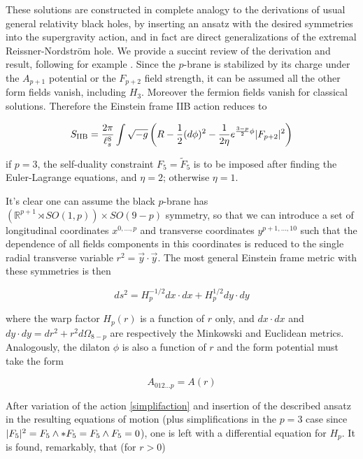 These solutions are constructed in complete analogy to the derivations of usual general relativity black holes, by inserting an ansatz with the desired symmetries into the supergravity action, and in fact are direct generalizations of the extremal Reissner-Nordstr\"om hole. We provide a succint review of the derivation and result, following for example \cite{MaldacenaDb}. Since the $p$-brane is stabilized by its charge under the $A_{p+1}$ potential or the $F_{p+2}$ field strength, it can be assumed all the other form fields vanish, including $H_3$. Moreover the fermion fields vanish for classical solutions. Therefore the Einstein frame IIB action reduces to

\begin{equation}
	S_\text{IIB} = \frac{2\pi}{\ell_s^8} \int \sqrt{-g} \left( R - \frac{1}{2}(d\phi)^2 - \frac{1}{2\eta} e^{\frac{3-p}{2} \phi} |F_{p+2}|^2 \right)
	\label{simplifaction}
\end{equation}

if $p=3$, the self-duality constraint $F_5 = \tilde F_5$ is to be imposed after finding the Euler-Lagrange equations, and $\eta = 2$; otherwise $\eta = 1$.

It's clear one can assume the black $p$-brane has $\left( \mathbb{R}^{p+1} \rtimes SO(1,p) \right)\times SO(9-p)$ symmetry, so that we can introduce a set of longitudinal coordinates $x^{0,\ldots,p}$ and transverse coordinates $y^{p+1,\ldots,10}$ such that the dependence of all fields components in this coordinates is reduced to the single radial transverse variable $r^2 = \vec y \cdot \vec y$. The most general Einstein frame metric with these symmetries is then

\begin{equation}
	ds^2 = H_p^{-1/2} dx \cdot dx + H_p^{1/2} dy \cdot dy
	\label{}
\end{equation}

where the warp factor $H_p(r)$ is a function of $r$ only, and $dx \cdot dx$ and $dy \cdot dy = dr^2 + r^2 d\Omega_{8-p}$ are respectively the Minkowski and Euclidean metrics. Analogously, the dilaton $\phi$ is also a function of $r$ and the form potential must take the form

\begin{equation}
	A_{012\ldots p} = A(r)
	\label{}
\end{equation}

After variation of the action \eqref{simplifaction} and insertion of the described ansatz in the resulting equations of motion (plus simplifications in the $p=3$ case since $|F_5|^2 = F_5 \wedge \ast F_5 = F_5 \wedge F_5 = 0$), one is left with a differential equation for $H_p$. It is found, remarkably, that (for $r>0$)

